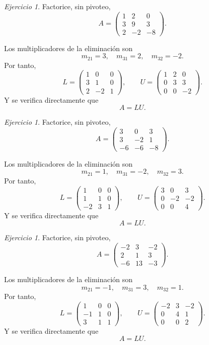 \documentclass[12pt]{article}
\theoremstyle{remark}
\newtheorem{Ejer}[definicion]{Ejercicio}
\begin{document}
\begin{Ejer} Factorice, sin pivoteo,
\[
A=\begin{pmatrix}1 & 2 & 0\\3 & 9 & 3\\2 & -2 & -8\end{pmatrix}.
\]

Los multiplicadores de la eliminación son
\[
m_{21}=3,\quad m_{31}=2,\quad m_{32}=-2.
\]
Por tanto,
\[
L=\begin{pmatrix}1 & 0 & 0\\3 & 1 & 0\\2 & -2 & 1\end{pmatrix},\qquad U=\begin{pmatrix}1 & 2 & 0\\0 & 3 & 3\\0 & 0 & -2\end{pmatrix}.
\]
Y se verifica directamente que
\[
\boxed{A=LU}.
\]
\end{Ejer}
\begin{Ejer}
Factorice, sin pivoteo,
\[
A=\begin{pmatrix}3 & 0 & 3\\3 & -2 & 1\\-6 & -6 & -8\end{pmatrix}.
\]

 Los multiplicadores de la eliminación son
\[
m_{21}=1,\quad m_{31}=-2,\quad m_{32}=3.
\]
Por tanto,
\[
L=\begin{pmatrix}1 & 0 & 0\\1 & 1 & 0\\-2 & 3 & 1\end{pmatrix},\qquad U=\begin{pmatrix}3 & 0 & 3\\0 & -2 & -2\\0 & 0 & 4\end{pmatrix}.
\]
Y se verifica directamente que
\[
\boxed{A=LU}.
\]
\end{Ejer}
\begin{Ejer}
Factorice, sin pivoteo,
\[
A=\begin{pmatrix}-2 & 3 & -2\\2 & 1 & 3\\-6 & 13 & -3\end{pmatrix}.
\]


Los multiplicadores de la eliminación son
\[
m_{21}=-1,\quad m_{31}=3,\quad m_{32}=1.
\]
Por tanto,
\[
L=\begin{pmatrix}1 & 0 & 0\\-1 & 1 & 0\\3 & 1 & 1\end{pmatrix},\qquad U=\begin{pmatrix}-2 & 3 & -2\\0 & 4 & 1\\0 & 0 & 2\end{pmatrix}.
\]
Y se verifica directamente que
\[
\boxed{A=LU}.
\]
\end{Ejer}
\end{document}

